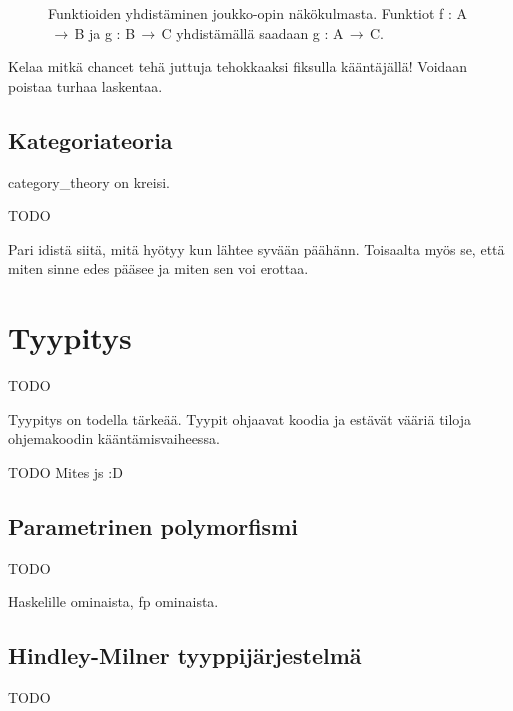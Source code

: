 \begin{figure}[htbp]
  \caption{Funktioiden yhdistäminen joukko-opin näkökulmasta. Funktiot f : A$\,\to\,$B ja g : B$\,\to\,$C yhdistämällä saadaan g : A$\,\to\,$C.}
\end{figure}


Kelaa mitkä chancet tehä juttuja tehokkaaksi fiksulla kääntäjällä! Voidaan poistaa turhaa laskentaa.

\subsection{Kategoriateoria}

\Gls{category_theory} on kreisi.

TODO

Pari idistä siitä, mitä hyötyy kun lähtee syvään päähänn. Toisaalta myös se, että miten sinne edes pääsee ja miten sen voi erottaa.

\section{Tyypitys}

TODO

Tyypitys on todella tärkeää. Tyypit ohjaavat koodia ja estävät vääriä tiloja ohjemakoodin kääntämisvaiheessa.

TODO Mites \gls{js} :D



\subsection{Parametrinen polymorfismi}

TODO

Haskelille ominaista, \gls{fp} ominaista.


\subsection{Hindley-Milner tyyppijärjestelmä}

TODO


